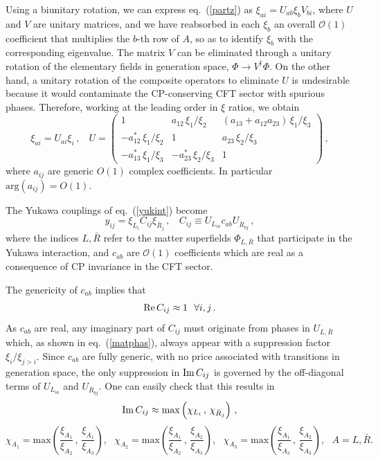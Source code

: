 \documentclass[a4paper,12pt]{article}
\newcommand{\beq}{\begin{equation}}
\newcommand{\eeq}{\end{equation}}
\def\eq#1{eq.~(\ref{#1})}
\def\eq#1{eq.~(\ref{#1})}
\begin{document}
Using a biunitary rotation, we can express \eq{partz} as $\xi_{ai} =U_{ab}\xi_b V_{bi}$, where $U$ and $V$ are unitary matrices, and we have reabsorbed in each $\xi_b$ an overall ${\mathcal O}(1)$ coefficient that multiplies the $b$-th row of $A$, so as to identify $\xi_b$ with the corresponding eigenvalue. The matrix $V$ can be eliminated through a unitary rotation of the elementary fields in generation space, $\Phi \to V^\dagger \Phi$. On the other hand, a unitary rotation of the composite operators to eliminate $U$ is undesirable because it would contaminate the CP-conserving CFT sector with spurious phases. Therefore, working at the leading order in $\xi$ ratios, we obtain
\beq
\xi_{ai} = U_{ai}\xi_i \, , ~~~~U= \begin{pmatrix}
1 & a_{12}\, {\xi_1}/{\xi_2} & (a_{13}+a_{12}a_{23})\, {\xi_1}/{\xi_3} \\
-a_{12}^*\, {\xi_1}/{\xi_2}& 1 & a_{23}\, {\xi_2}/{\xi_3}\\
-a_{13}^*\, {\xi_1}/{\xi_3} & -a_{23}^*\, {\xi_2}/{\xi_3} & 1
\end{pmatrix} \, ,
\label{matphas}
\eeq
where $a_{ij}$ are generic $O(1)$ complex coefficients. In particular ${\mathrm{arg}}(a_{ij})=O(1)$.

The Yukawa couplings of \eq{yukint} become
\beq
y_{ij} =\xi_{L_i} C_{ij} \xi_{{\bar R}_j} \, ,~~~~C_{ij}\equiv U_{L_{ia}} c_{ab} U_{{\bar R}_{bj}} \, ,
\label{yukintclever}
\eeq
where the indices $L,{\bar R}$ refer to the matter superfields $\Phi_{L,{\bar R}}$ that participate in the Yukawa interaction, and $c_{ab}$ are ${\mathcal O}(1)$ coefficients which are real as a consequence of CP invariance in the CFT sector.

The genericity of $c_{ab}$ implies that
\beq
{\rm Re}\, C_{ij} \approx 1 ~~\forall i,j \, .
\eeq
As $c_{ab}$ are real, any imaginary part of $C_{ij}$ must originate from phases in $U_{L,{\bar R}}$ which, as shown in \eq{matphas}, always appear with a suppression factor $\xi_i /\xi_{j>i}$. Since $c_{ab}$ are fully generic, with no price associated with transitions in generation space, the only suppression in ${\rm Im}\, C_{ij}$ is governed by the off-diagonal terms of $U_{L_{ia}}$ and $U_{{\bar R}_{bj}}$. One can easily check that this results in
\beq
{\rm Im}\, C_{ij} \approx {\text{max}}\left( \chi_{L_i} \, ,\, \chi_{{\bar R}_j} \right) \, ,
\label{ImC}
\eeq
\beq
\chi_{A_1} = {\text{max}}\left( \frac{\xi_{A_1}}{\xi_{A_2}}\, ,\, \frac{\xi_{A_1}}{\xi_{A_3}} \right),~~~
\chi_{A_2} = {\text{max}}\left( \frac{\xi_{A_1}}{\xi_{A_2}}\, ,\, \frac{\xi_{A_2}}{\xi_{A_3}} \right),~~~
\chi_{A_3} = {\text{max}}\left( \frac{\xi_{A_1}}{\xi_{A_3}}\, ,\, \frac{\xi_{A_2}}{\xi_{A_3}} \right),~~~A=L,{\bar R}  .
\nonumber 
\eeq
\end{document}
